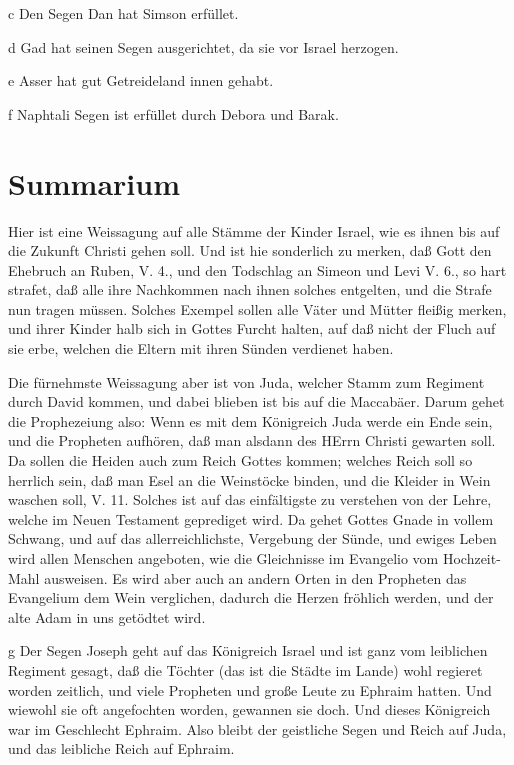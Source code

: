 c Den Segen Dan hat Simson erfüllet.


d Gad hat seinen Segen ausgerichtet, da sie vor Israel herzogen.

e Asser hat gut Getreideland innen gehabt.

f Naphtali Segen ist erfüllet durch Debora und Barak.

\section{Summarium}

Hier ist eine Weissagung auf alle Stämme der Kinder Israel, wie es ihnen bis auf die Zukunft Christi gehen soll. Und ist hie sonderlich zu merken, daß Gott den Ehebruch an Ruben, V. 4., und den Todschlag an Simeon und Levi V. 6., so hart strafet, daß alle ihre Nachkommen nach ihnen solches entgelten, und die Strafe nun tragen müssen. Solches Exempel sollen alle Väter und Mütter fleißig merken, und ihrer Kinder halb sich in Gottes Furcht halten, auf daß nicht der Fluch auf sie erbe, welchen die Eltern mit ihren Sünden verdienet haben.

Die fürnehmste Weissagung aber ist von Juda, welcher Stamm zum Regiment durch David kommen, und dabei blieben ist bis auf die Maccabäer. Darum gehet die Prophezeiung also: Wenn es mit dem Königreich Juda werde ein Ende sein, und die Propheten aufhören, daß man alsdann des HErrn Christi gewarten soll. Da sollen die Heiden auch zum Reich Gottes kommen; welches Reich soll so herrlich sein, daß man Esel an die Weinstöcke binden, und die Kleider in Wein waschen soll, V. 11. Solches ist auf das einfältigste zu verstehen von der Lehre, welche im Neuen Testament geprediget wird. Da gehet Gottes Gnade in vollem Schwang, und auf das allerreichlichste, Vergebung der Sünde, und ewiges Leben wird allen Menschen angeboten, wie die Gleichnisse im Evangelio vom Hochzeit-Mahl ausweisen. Es wird aber auch an andern Orten in den Propheten das Evangelium dem Wein verglichen, dadurch die Herzen fröhlich werden, und der alte Adam in uns getödtet wird.

g Der Segen Joseph geht auf das Königreich Israel und ist ganz vom leiblichen Regiment gesagt, daß die Töchter (das ist die Städte im Lande) wohl regieret worden zeitlich, und viele Propheten und große Leute zu Ephraim hatten. Und wiewohl sie oft angefochten worden, gewannen sie doch. Und dieses Königreich war im Geschlecht Ephraim. Also bleibt der geistliche Segen und Reich auf Juda, und das leibliche Reich auf Ephraim.

